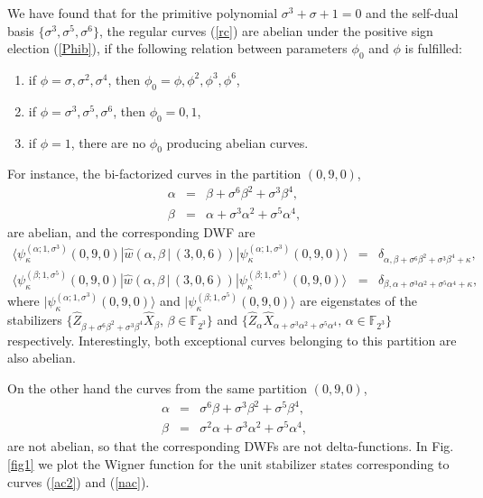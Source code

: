 \documentclass{article}
\begin{document}
We have found that for the primitive polynomial $\sigma^{3} + \sigma + 1 = 0$
and the self-dual basis $\{\sigma^{3},\sigma^{5},\sigma^{6}\}$, the regular
curves (\ref{rc}) are abelian under the positive sign election (\ref{Phib}), if
the following relation between parameters $\phi_{0}$ and $\phi$ is fulfilled:
\begin{enumerate}
  \item if $\phi =\sigma, \sigma^{2}, \sigma^{4}$, then $\phi_{0} =
    \phi,\phi^{2},\phi^{3}, \phi^{6}$,
  \item if $\phi = \sigma^{3}, \sigma^{5}, \sigma^{6}$, then $\phi_{0}=0,1$,
  \item if $\phi = 1$, there are no $\phi_{0}$ producing abelian curves.
\end{enumerate}
For instance, the bi-factorized curves in the partition $(0,9,0)$,
\begin{eqnarray}
  \alpha &=& \beta + \sigma^{6} \beta^{2} + \sigma^{3}\beta^{4},
  \label{ac1} \\
  \beta &=& \alpha + \sigma^{3} \alpha^{2} + \sigma^{5}\alpha^{4},
  \label{ac2}
\end{eqnarray}
are abelian, and the corresponding DWF are
\begin{eqnarray*}
  \langle \psi_{\kappa}^{(\alpha ; 1,\sigma^{3})}(0,9,0)
  |\hat{w}\left(\alpha,\beta \, | \, (3,0,6)\right)
  |\psi_{\kappa}^{(\alpha ; 1,\sigma^{3})}(0,9,0)\rangle
  &=& \delta_{\alpha,\beta + \sigma^{6}\beta^{2} + \sigma^{3} \beta^{4} +
  \kappa}, \\
  \langle \psi_{\kappa }^{(\beta ; 1,\sigma^{5})}(0,9,0)
  |\hat{w}\left(\alpha,\beta \, | \, (3,0,6)\right)
  |\psi_{\kappa}^{(\beta ; 1,\sigma^{5})}(0,9,0)\rangle
  &=& \delta_{\beta,\alpha + \sigma^{3}\alpha^{2} + \sigma^{5} \alpha^{4} +
  \kappa },
\end{eqnarray*}
where $|\psi_{\kappa}^{(\alpha ; 1,\sigma^{3})}(0,9,0)\rangle$ and
$|\psi_{\kappa }^{(\beta ; 1,\sigma^{5})}(0,9,0)\rangle$ are eigenstates of the
stabilizers $\{\hat{Z}_{\beta +\sigma ^{6}\beta ^{2}+\sigma ^{3}\beta ^{4}}
\hat{X}_{\beta }, \, \beta \in \mathbb{F}_{2^{3}}\}$ and $\{\hat{Z}_{\alpha }
\hat{X}_{\alpha + \sigma^{3}\alpha^{2} + \sigma^{5}\alpha^{4}}, \, \alpha \in
\mathbb{F}_{2^{3}}\}$ respectively. Interestingly, both exceptional curves
belonging to this partition are also abelian.

On the other hand the curves from the same partition $(0,9,0)$,
\begin{eqnarray}
  \alpha &=&\sigma^{6}\beta +\sigma ^{3}\beta ^{2}+\sigma ^{5}\beta ^{4},
  \label{nac1} \\
  \beta &=&\sigma^{2}\alpha +\sigma ^{3}\alpha ^{2}+\sigma ^{5}\alpha ^{4},
  \label{nac}
\end{eqnarray}
are not abelian, so that the corresponding DWFs are not delta-functions. In Fig.
\ref{fig1} we plot the Wigner function for the unit stabilizer states
corresponding to curves (\ref{ac2}) and (\ref{nac}).
\end{document}
